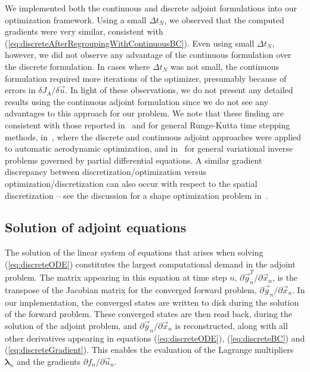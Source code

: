 \documentclass[twocolumn,numbook]{svjour3}          %
\def\u{{\vec u}}
\def\x{{\vec x}}
\def\p{{\vec{g}}}
\def\blambda{{\pmb{\lambda}}}%
\def\myobj{J}
\begin{document}
We implemented both the continuous and discrete adjoint formulations into our
optimization framework. Using a small $\Delta t_N$, we observed that the
computed gradients were very similar, consistent with
(\ref{eq:discreteAfterRegroupingWithContinuousBC}). Even using small $\Delta
t_N$, however, we did not observe any advantage of the continuous formulation
over the discrete formulation. In cases where $\Delta t_N$ was not small, the
continuous formulation required more iterations of the optimizer, presumably
because of errors in $\delta \myobj_A / \delta \u$. In light of these observations,
we do not present any detailed results using the continuous adjoint
formulation since we do not see any advantages to this approach for our
problem. We note that these finding are consistent with those reported
in~\cite{Hager2000} and \cite{Walther2007} for general Runge-Kutta
time stepping methods, 
in~\cite{Nadarajah:2000}, where the discrete and continuous adjoint
approaches were applied to automatic  aerodynamic optimization, and
in~\cite{Petra2011} for general variational inverse problems governed
by partial differential equations. A
 similar gradient discrepancy between discretization/optimization
 versus optimization/discretization can also occur with respect to the
 spatial discretization -- see the discussion for a shape
 optimization problem in~\cite{GunzburgerBook}. 



\subsection{Solution of adjoint equations} The solution of the linear system of
equations that arises when solving (\ref{eq:discreteODE}) constitutes the
largest computational demand in the adjoint problem. The matrix appearing in
this equation at time step $n$, $\partial {\p_n^T}/\partial {\x_n}$, is
the transpose of the Jacobian matrix for the converged forward problem,
    $\partial {\p_n}/\partial {\x_n}$. In our implementation, the converged
    states are written to disk during the solution of the forward problem. These
converged states are then read back, during the solution of the adjoint problem,
          and $\partial {\p_n}/\partial {\x_n}$ is reconstructed, along with all
other derivatives appearing in equations (\ref{eq:discreteODE}),
      (\ref{eq:discreteBC}) and (\ref{eq:discreteGradient}). This enables the
      evaluation of the Lagrange multipliers $\blambda_n$ and the gradients
      $\partial f_n/\partial {\u_n}$.
\end{document}
